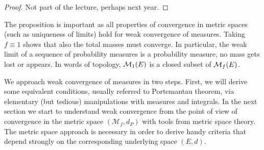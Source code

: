 \begin{proof}[Proof]
	Not part of the lecture, perhaps next year.
\end{proof}
The proposition is important as all properties of convergence in  metric spaces (such as uniqueness of limits) hold for weak convergence of measures. Taking $f \equiv 1$ shows that also the total masses must converge. In particular, the weak limit of a sequence of probability measures is a probability measure, no mass gets lost or appears. In words of topology, $\mathcal{M}_1(E)$ is a closed subset of $\mathcal{M}_f(E)$.\smallskip

	\marginpar{\textcolor{red}{Lecture 12}}
We approach weak convergence of measures in two steps. First, we will derive some equivalent conditions, usually referred to Portemantau theorem, via elementary (but tedious) manipulations with measures and integrals. In the next section we start to understand weak convergence from the point of view of convergence in the metric space $(\mathcal M_f,d_P)$ with tools from metric space theory. The metric space approach is necessary in order to derive handy criteria that depend strongly on the corresponding underlying space $(E,d)$.\smallskip

